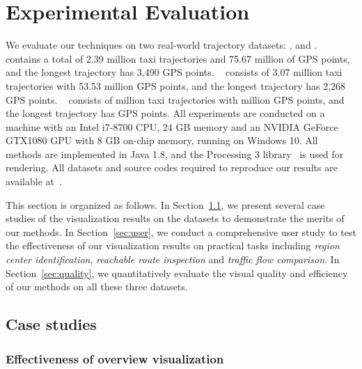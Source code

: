 \section{Experimental Evaluation}\label{sec:exp}
We evaluate our techniques on two real-world trajectory datasets: \pt{}, \sz{} and \cd{}.
\pt{}~\cite{pt} contains a total of 2.39 million taxi trajectories and 75.67 million of GPS points, and the longest trajectory has 3,490 GPS points.
\sz{}~\cite{sz} consists of 3.07 million taxi trajectories with 53.53 million GPS points, and the longest trajectory has 2,268 GPS points. 
\cd{}~\cite{cd} consists of  million taxi trajectories with  million GPS points, and the longest trajectory has  GPS points.  All experiments are conducted on a machine with an Intel i7-8700 CPU, 24 GB memory and an NVIDIA GeForce GTX1080 GPU with 8 GB on-chip memory, running on Windows 10. All methods are implemented in Java 1.8, and the Processing 3 library~\cite{p3} is used for rendering. All datasets and source codes required to reproduce our results are available at~\cite{code}.

This section is organized as follows.
In Section~\ref{sec:case}, we present several case studies of the visualization results on the \pt{} datasets to demonstrate the merits of our methods.
In Section~\ref{sec:user}, we conduct a comprehensive user study to test the effectiveness of our visualization results on practical tasks including \textit{region center identification}, \textit{reachable route inspection} and \textit{traffic flow comparison}. In Section~\ref{sec:quality}, we quantitatively evaluate the visual quality and efficiency of our methods on all these three datasets.

\trim \trim

\subsection{Case studies}\label{sec:case}
\subsubsection{Effectiveness of overview visualization}

